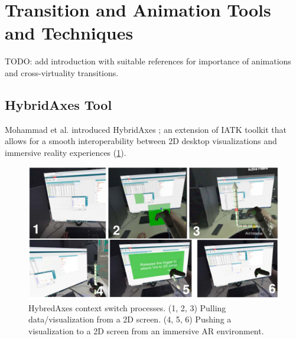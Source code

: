 \documentclass{vgtc}                          %
\begin{document}
\section{Transition and Animation Tools and Techniques}

TODO: add introduction with suitable references for importance of animations
and cross-virtuality transitions.
\subsection{HybridAxes Tool}
Mohammad et al. introduced HybridAxes \cite{hybridaxes_tool}; an extension of
IATK toolkit that allows for a smooth interoperability between 2D desktop
visualizations and immersive reality experiences (\cref{fig:hybridaxes}).

\medskip

\begin{figure}[tb]
	\centering
	\includegraphics[width=\columnwidth]{hybridaxes}
	\caption[Caption for RagRug]{HybredAxes context switch processes. (1, 2, 3)
		Pulling data/visualization from a 2D screen. (4, 5, 6) Pushing a
		visualization to a 2D screen from an immersive AR environment.}
	\label{fig:hybridaxes}
\end{figure}
\end{document}
